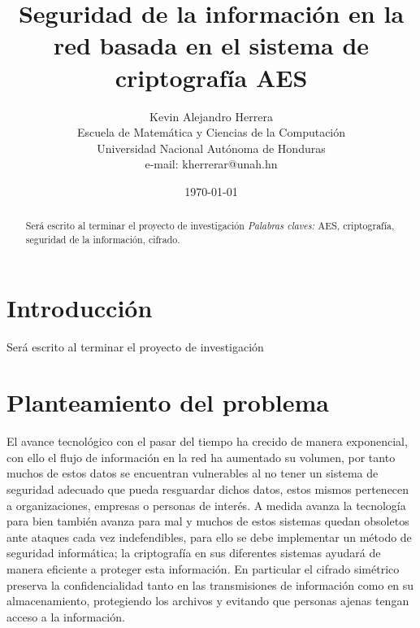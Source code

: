 \documentclass[peerreview]{IEEEtran}
\begin{document}
\title{Seguridad de la información en la red basada en el sistema de criptografía AES}


\author{Kevin Alejandro Herrera\\
Escuela de Matemática y Ciencias de la Computación\\
Universidad Nacional Aut\'onoma de Honduras\\
e-mail: kherrerar@unah.hn
}
\date{\today}

\maketitle
\tableofcontents
\listoffigures
\listoftables

\IEEEpeerreviewmaketitle
\begin{abstract}
Será escrito al terminar el proyecto de investigación
\bigbreak 
\textit{Palabras claves:} AES, criptografía, seguridad de la información, cifrado.
\end{abstract}






\section{Introducci\'on}
Será escrito al terminar el proyecto de investigación

\section{Planteamiento del problema}
 El avance tecnológico con el pasar del tiempo ha crecido de manera exponencial, con ello el flujo de información en la red ha aumentado su volumen, por tanto muchos de estos datos se encuentran vulnerables al no tener un sistema de seguridad adecuado que pueda resguardar dichos datos, estos mismos pertenecen a organizaciones, empresas o personas de interés.
 \bigbreak
 A medida avanza la tecnología para bien también avanza para mal y muchos de estos sistemas quedan obsoletos ante ataques cada vez indefendibles, para ello se debe implementar un método de seguridad informática; la criptografía en sus diferentes sistemas ayudará de manera eficiente a proteger esta información.
 \bigbreak
  En particular el cifrado simétrico preserva la confidencialidad tanto en las transmisiones de información como en su almacenamiento, protegiendo los archivos y evitando que personas ajenas tengan acceso a la información.
\end{document}

